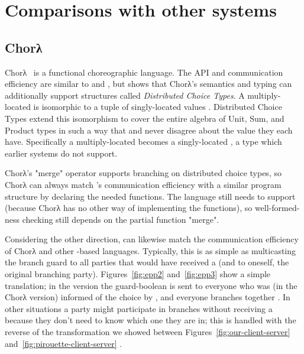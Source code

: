 \section{Comparisons with other systems}
\label{sec:formalism-comparisons}


\subsection{Chorλ}\label{sec:chor-lambda}
Chorλ~\cite{chor-lambda} is a functional choreographic language.
The API and communication efficiency are similar to \cite{hirsch2021pirouette} and \cite{giallorenzo-choral},
but \cite{chor-lambda-2} shows that Chorλ's semantics and typing can additionally support structures called \emph{Distributed Choice Types}.
A multiply-located  is isomorphic to a tuple of singly-located values .
Distributed Choice Types extend this isomorphism to cover the entire algebra of Unit, Sum, and Product types
in such a way that  and  never disagree about the value they each have.
Specifically a multiply-located  becomes a singly-located ,
a type which earlier systems do not support.

Chorλ's "merge" operator supports branching on distributed choice types,
so Chorλ can always match \HLSCentral's communication efficiency with a similar program structure
by declaring the needed  functions.
The language still needs to support 
(because Chorλ has no other way of implementing the  functions),
so well-formed-ness checking still depends on the partial function "merge".

Considering the other direction, \HLSCentral can likewise match the communication efficiency of Chorλ
and other -based languages.
Typically, this is as simple as multicasting the branch guard to all parties that would have received a 
(and to oneself, the original branching party).
Figures~\ref{fig:epp2} and~\ref{fig:epp3} show a simple translation;
in the \HLSCentral version the guard-boolean is sent to everyone who was (in the Chorλ version) informed of the choice by ,
and everyone branches together
.
In other situations a party might participate in branches without receiving a 
because they don't need to know which one they are in;
this is handled with the reverse of the transformation we showed between Figures~\ref{fig:our-client-server} and~\ref{fig:pirouette-client-server}
.

